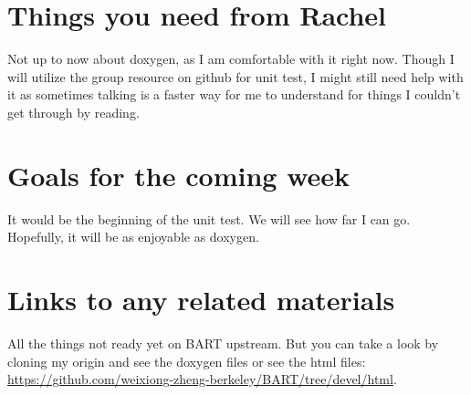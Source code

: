 \documentclass{article}
\begin{document}
\section{Things you need from Rachel}
Not up to now about doxygen, as I am comfortable with it right now. Though I will utilize 
the group resource on github for unit test, I might still need help with it as sometimes talking
is a faster way for me to understand for things I couldn't get through by reading.

\section{Goals for the coming week}
It would be the beginning of the unit test. We will see how far I can go. Hopefully, it
will be as enjoyable as doxygen.

\section{Links to any related materials}
All the things not ready yet on BART upstream. But you can take a look by cloning my origin and see the doxygen files or see the html files:  \url{https://github.com/weixiong-zheng-berkeley/BART/tree/devel/html}.



%
%
%

\end{document}
